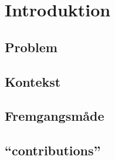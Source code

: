 \chapter{Introduktion}
  \section{Problem}	 
  \section{Kontekst}
  \section{Fremgangsmåde}
  \section{``contributions''}
